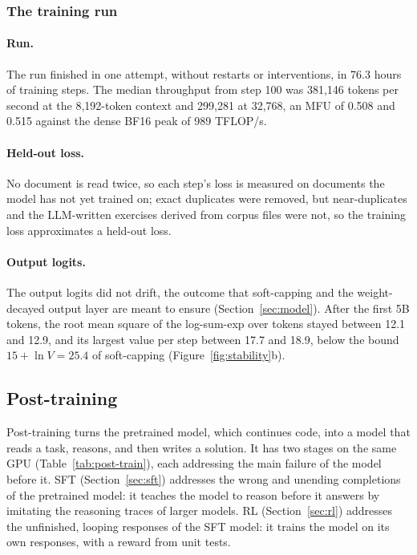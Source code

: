 \documentclass[sigconf,nonacm,balance=false]{acmart}
\begin{document}
\subsubsection{The training run}

\paragraph{Run.} The run finished in one attempt, without restarts or interventions, in 76.3 hours of training steps.
The median throughput from step 100 was 381,146 tokens per second at the 8,192-token context and 299,281 at 32,768,
an MFU of 0.508 and 0.515 against the dense BF16 peak of 989 TFLOP/s.

\paragraph{Held-out loss.} No document is read twice, so each step's loss is measured on documents the model has not
yet trained on; exact duplicates were removed, but near-duplicates and the LLM-written exercises derived from corpus
files were not, so the training loss approximates a held-out loss.

\paragraph{Output logits.} The output logits did not drift, the outcome that soft-capping and the weight-decayed
output layer are meant to ensure (Section~\ref{sec:model}). After the first 5B tokens, the root mean square of the
log-sum-exp over tokens stayed between 12.1 and 12.9, and its largest value per step between 17.7 and 18.9, below the
bound $15 + \ln V = 25.4$ of soft-capping (Figure~\ref{fig:stability}b).

\subsection{Post-training}
\label{sec:posttrain}

Post-training turns the pretrained model, which continues code, into a model that reads a task, reasons, and then
writes a solution. It has two stages on the same GPU (Table~\ref{tab:post-train}), each addressing the main failure of
the model before it. SFT (Section~\ref{sec:sft}) addresses the wrong and unending completions of the pretrained model:
it teaches the model to reason before it answers by imitating the reasoning traces of larger models. RL
(Section~\ref{sec:rl}) addresses the unfinished, looping responses of the SFT model: it trains the model on its own
responses, with a reward from unit tests.
\end{document}
